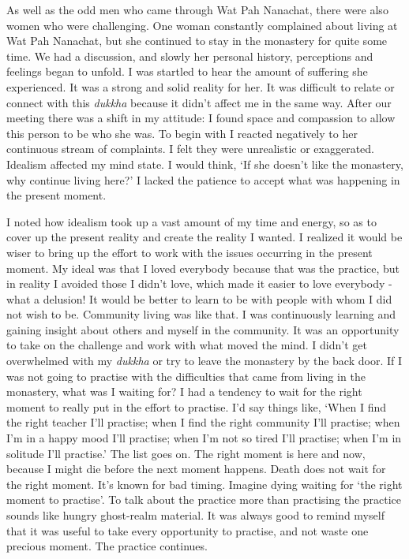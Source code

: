 As well as the odd men who came through Wat Pah Nanachat, there were
also women who were challenging. One woman constantly complained about
living at Wat Pah Nanachat, but she continued to stay in the monastery
for quite some time. We had a discussion, and slowly her personal
history, perceptions and feelings began to unfold. I was startled to
hear the amount of suffering she experienced. It was a strong and solid
reality for her. It was difficult to relate or connect with this
\emph{dukkha} because it didn't affect me in the same way. After our
meeting there was a shift in my attitude: I found space and compassion
to allow this person to be who she was. To begin with I reacted
negatively to her continuous stream of complaints. I felt they were
unrealistic or exaggerated. Idealism affected my mind state. I would
think, `If she doesn't like the monastery, why continue living here?' I
lacked the patience to accept what was happening in the present moment.

I noted how idealism took up a vast amount of my time and energy, so as
to cover up the present reality and create the reality I wanted. I
realized it would be wiser to bring up the effort to work with the
issues occurring in the present moment. My ideal was that I loved
everybody because that was the practice, but in reality I avoided those
I didn't love, which made it easier to love everybody - what a delusion!
It would be better to learn to be with people with whom I did not wish
to be. Community living was like that. I was continuously learning and
gaining insight about others and myself in the community. It was an
opportunity to take on the challenge and work with what moved the mind.
I didn't get overwhelmed with my \emph{dukkha} or try to leave the
monastery by the back door. If I was not going to practise with the
difficulties that came from living in the monastery, what was I waiting
for? I had a tendency to wait for the right moment to really put in the
effort to practise. I'd say things like, `When I find the right teacher
I'll practise; when I find the right community I'll practise; when I'm
in a happy mood I'll practise; when I'm not so tired I'll practise; when
I'm in solitude I'll practise.' The list goes on. The right moment is
here and now, because I might die before the next moment happens. Death
does not wait for the right moment. It's known for bad timing. Imagine
dying waiting for `the right moment to practise'. To talk about the
practice more than practising the practice sounds like hungry
ghost-realm material. It was always good to remind myself that it was
useful to take every opportunity to practise, and not waste one precious
moment. The practice continues.


